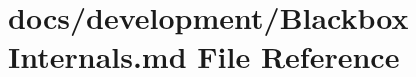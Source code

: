 \hypertarget{Blackbox_01Internals_8md}{\section{docs/development/\+Blackbox Internals.\+md File Reference}
\label{Blackbox_01Internals_8md}
}
